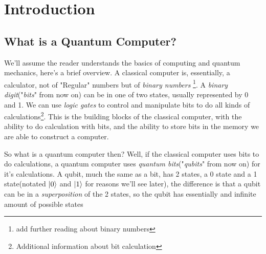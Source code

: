 \documentclass{article}
\numberwithin{equation}{section} %
\def\biblio{\clearpage} %
\begin{document}
\def\biblio{} %


\restoregeometry %

\thispagestyle{plain} %


\newpage

\tableofcontents

\newpage
{}
\section{Introduction}

\subsection{What is a Quantum Computer?}
We'll assume the reader understands the basics of computing and quantum mechanics, here's a brief overview. \newline
 A classical computer is, essentially, a calculator, not of "Regular" numbers but of \textit{binary numbers} \footnote{ add further reading about binary numbers}. A \textit{binary digit}("\textit{bits}" from now on) can be in one of two states, usually represented by 0 and 1. We can use \textit{logic gates} to control and manipulate bits to do all kinds of calculations\footnote{Additional information about bit calculation}. This is the building blocks of the classical computer, with the ability to do calculation with bits, and the ability to store bits in the memory we are able to construct a computer.\newline \par
So what is a quantum computer then? Well, if the classical computer uses bits to do calculations, a quantum computer uses \textit{quantum bits}("\textit{qubits}" from now on) for it's calculations. A qubit, much the same as a bit, has 2 states, a 0 state and a 1 state(notated $\ket{0}$ and $\ket{1}$ for reasons we'll see later), the difference is that a qubit can be in a \textit{superposition} of the 2 states, so the qubit has essentially and infinite amount of possible states
\end{document}
